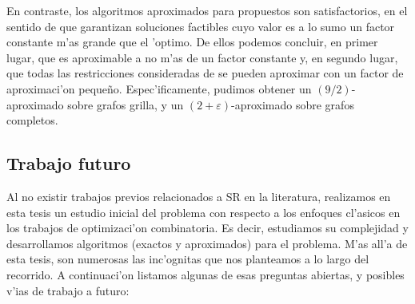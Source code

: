 En contraste, los algoritmos aproximados para  propuestos son satisfactorios, en el sentido de que garantizan soluciones factibles cuyo valor es a lo sumo un factor constante m'as grande que el 'optimo. De ellos podemos concluir, en primer lugar, que  es aproximable a no m'as de un factor constante y, en segundo lugar, que todas las restricciones consideradas de  se pueden aproximar con un factor de aproximaci'on peque\~no. Espec'ificamente, pudimos obtener un $(9/2)$-aproximado sobre grafos grilla, y un $(2 + \varepsilon)$-aproximado sobre grafos completos.

\subsection*{Trabajo futuro}

Al no existir trabajos previos relacionados a SR en la literatura, realizamos en esta tesis un estudio inicial del problema con respecto a los enfoques cl'asicos en los trabajos de optimizaci'on combinatoria. Es decir, estudiamos su complejidad y desarrollamos algoritmos (exactos y aproximados) para el problema. M'as all'a de esta tesis, son numerosas las inc'ognitas que nos planteamos a lo largo del recorrido. A continuaci'on listamos algunas de esas preguntas abiertas, y posibles v'ias de trabajo a futuro:

